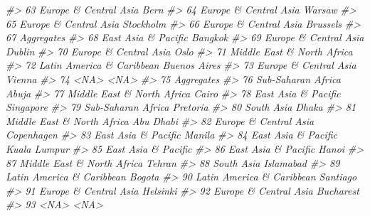 \documentclass[
  xelatex, ja=standard]{bxjsbook}
\newenvironment{Shaded}{\begin{snugshade}}{\end{snugshade}}
\newcommand{\CommentTok}[1]{\textcolor[rgb]{0.56,0.35,0.01}{\textit{#1}}}
\theoremstyle{definition}
\theoremstyle{definition}
\theoremstyle{definition}
\theoremstyle{definition}
\theoremstyle{remark}
\begin{document}
\begin{Shaded}
\begin{Highlighting}[]
\CommentTok{\#\textgreater{} 63       Europe \& Central Asia                Bern}
\CommentTok{\#\textgreater{} 64       Europe \& Central Asia              Warsaw}
\CommentTok{\#\textgreater{} 65       Europe \& Central Asia           Stockholm}
\CommentTok{\#\textgreater{} 66       Europe \& Central Asia            Brussels}
\CommentTok{\#\textgreater{} 67                  Aggregates                    }
\CommentTok{\#\textgreater{} 68         East Asia \& Pacific             Bangkok}
\CommentTok{\#\textgreater{} 69       Europe \& Central Asia              Dublin}
\CommentTok{\#\textgreater{} 70       Europe \& Central Asia                Oslo}
\CommentTok{\#\textgreater{} 71  Middle East \& North Africa                    }
\CommentTok{\#\textgreater{} 72   Latin America \& Caribbean        Buenos Aires}
\CommentTok{\#\textgreater{} 73       Europe \& Central Asia              Vienna}
\CommentTok{\#\textgreater{} 74                        \textless{}NA\textgreater{}                \textless{}NA\textgreater{}}
\CommentTok{\#\textgreater{} 75                  Aggregates                    }
\CommentTok{\#\textgreater{} 76          Sub{-}Saharan Africa               Abuja}
\CommentTok{\#\textgreater{} 77  Middle East \& North Africa               Cairo}
\CommentTok{\#\textgreater{} 78         East Asia \& Pacific           Singapore}
\CommentTok{\#\textgreater{} 79          Sub{-}Saharan Africa            Pretoria}
\CommentTok{\#\textgreater{} 80                  South Asia               Dhaka}
\CommentTok{\#\textgreater{} 81  Middle East \& North Africa           Abu Dhabi}
\CommentTok{\#\textgreater{} 82       Europe \& Central Asia          Copenhagen}
\CommentTok{\#\textgreater{} 83         East Asia \& Pacific              Manila}
\CommentTok{\#\textgreater{} 84         East Asia \& Pacific        Kuala Lumpur}
\CommentTok{\#\textgreater{} 85         East Asia \& Pacific                    }
\CommentTok{\#\textgreater{} 86         East Asia \& Pacific               Hanoi}
\CommentTok{\#\textgreater{} 87  Middle East \& North Africa              Tehran}
\CommentTok{\#\textgreater{} 88                  South Asia           Islamabad}
\CommentTok{\#\textgreater{} 89   Latin America \& Caribbean              Bogota}
\CommentTok{\#\textgreater{} 90   Latin America \& Caribbean            Santiago}
\CommentTok{\#\textgreater{} 91       Europe \& Central Asia            Helsinki}
\CommentTok{\#\textgreater{} 92       Europe \& Central Asia           Bucharest}
\CommentTok{\#\textgreater{} 93                        \textless{}NA\textgreater{}                \textless{}NA\textgreater{}}

\end{Highlighting}
\end{Shaded}
\end{document}
